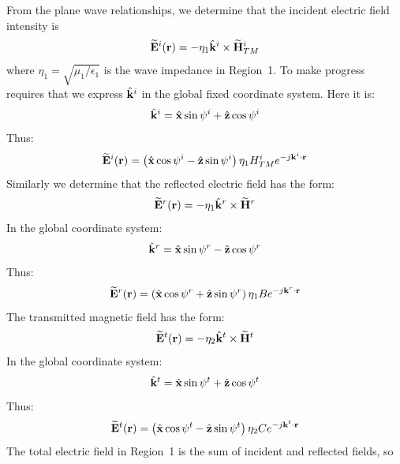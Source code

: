 From the plane wave relationships, we determine that the incident electric field intensity is
%
\begin{equation}
\widetilde{\bf E}^i({\bf r}) = -\eta_1 \hat{\bf k}^i \times \widetilde{\bf H}^i_{TM}              
\label{m0164_eEi}
\end{equation}
%
where $\eta_1=\sqrt{\mu_1 / \epsilon_1}$ is the wave impedance in Region~1.  
%
To make progress requires that we express $\hat{\bf k}^i$ in the global fixed coordinate system.  Here it is:
%
\begin{equation}
\hat{\bf k}^i = \hat{\bf x}\sin\psi^i + \hat{\bf z}\cos\psi^i 
\end{equation}
%
Thus:
%
\begin{equation}
\widetilde{\bf E}^i({\bf r}) = \left( \hat{\bf x}\cos\psi^i - \hat{\bf z}\sin\psi^i \right) \eta_1 H^i_{TM}  e^{-j{\bf k}^i\cdot{\bf r}}          
\label{m0164_eEi2}
\end{equation}
%
Similarly we determine that the reflected electric field has the form:
%
\begin{equation}
\widetilde{\bf E}^r({\bf r}) = -\eta_1 \hat{\bf k}^r \times \widetilde{\bf H}^r              
\label{m0164_eEr}
\end{equation}
%
In the global coordinate system:
%
\begin{equation}
\hat{\bf k}^r = \hat{\bf x}\sin\psi^r - \hat{\bf z}\cos\psi^r 
\label{m0164_ehkr}
\end{equation}
%
Thus:
%
\begin{equation}
\widetilde{\bf E}^r({\bf r}) = \left( \hat{\bf x}\cos\psi^r + \hat{\bf z}\sin\psi^r \right) \eta_1 B  e^{-j{\bf k}^r\cdot{\bf r}}          
\label{m0164_eEr2}
\end{equation}
%
The transmitted magnetic field has the form:
%
\begin{equation}
\widetilde{\bf E}^t({\bf r}) = -\eta_2 \hat{\bf k}^t \times \widetilde{\bf H}^t              
\label{m0164_eEt}
\end{equation}
%
In the global coordinate system:
%
\begin{equation}
\hat{\bf k}^t = \hat{\bf x}\sin\psi^t + \hat{\bf z}\cos\psi^t 
\label{m0164_ehkt}
\end{equation}
%
Thus:
%
\begin{equation}
\widetilde{\bf E}^t({\bf r}) = \left( \hat{\bf x}\cos\psi^t - \hat{\bf z}\sin\psi^t \right) \eta_2 C  e^{-j{\bf k}^t\cdot{\bf r}}          
\label{m0164_eEt2}
\end{equation}
%
The total electric field in Region~1 is the sum of incident and reflected fields, so
